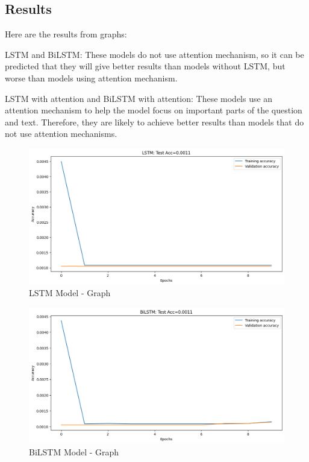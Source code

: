 \documentclass[11pt]{article}
\begin{document}
\subsection{Results}
Here are the results from graphs:

LSTM and BiLSTM: These models do not use attention mechanism, so it can be predicted that they will give better results than models without LSTM, but worse than models using attention mechanism.

LSTM with attention and BiLSTM with attention: These models use an attention mechanism to help the model focus on important parts of the question and text. Therefore, they are likely to achieve better results than models that do not use attention mechanisms.

\begin{center}
    \begin{figure}[htp]
    \begin{center}
    \includegraphics [scale=0.3] {ltsm}
    \end{center}
    \caption{LSTM Model - Graph}
    \label{refhinh1}
    \end{figure}
\end{center}

\begin{center}
    \begin{figure}[htp]
    \begin{center}
    \includegraphics [scale=0.3] {biltsm}
    \end{center}
    \caption{BiLSTM Model - Graph}
    \label{refhinh1}
    \end{figure}
\end{center}
\end{document}
